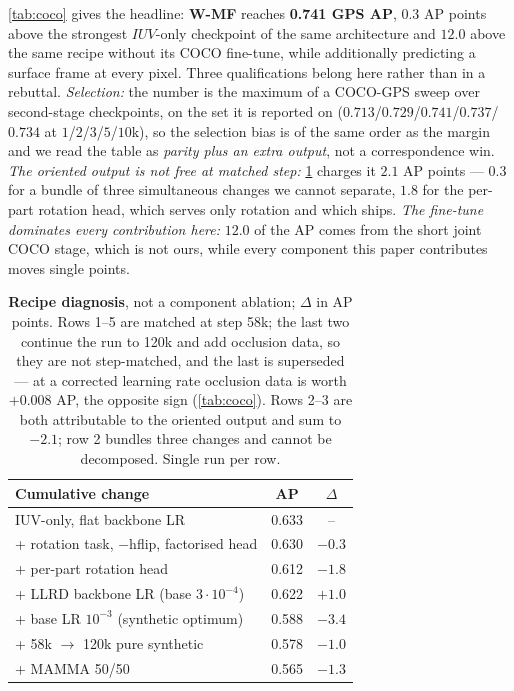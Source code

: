 \cref{tab:coco} gives the headline: \textbf{W-MF} reaches \textbf{0.741 GPS AP}, $0.3$ AP points
above the strongest $IUV$-only checkpoint of the same architecture and $12.0$ above the same recipe
without its COCO fine-tune, while additionally predicting a surface frame at every pixel. Three
qualifications belong here rather than in a rebuttal. \emph{Selection:} the number is the maximum
of a COCO-GPS sweep over second-stage checkpoints, on the set it is reported on
($0.713$/$0.729$/$\mathbf{0.741}$/$0.737$/$0.734$ at $1$/$2$/$3$/$5$/$10$k), so the selection bias
is of the same order as the margin and we read the table as \emph{parity plus an extra output}, not
a correspondence win. \emph{The oriented output is not free at matched step:} \cref{tab:recipe}
charges it $2.1$ AP points --- $0.3$ for a bundle of three simultaneous changes we cannot separate,
$1.8$ for the per-part rotation head, which serves only rotation and which ships. \emph{The
fine-tune dominates every contribution here:} $12.0$ of the AP comes from the short joint COCO
stage, which is not ours, while every component this paper contributes moves single points.

\begin{table}[!tb]
\centering\footnotesize\renewcommand{\arraystretch}{0.94}
\setlength{\tabcolsep}{5pt}
\begin{tabular}{@{}lcc@{}}
\toprule
Cumulative change & AP & $\Delta$ \\
\midrule
IUV-only, flat backbone LR              & 0.633 & --    \\
+ rotation task, $-$hflip, factorised head & 0.630 & $-0.3$ \\
+ per-part rotation head                & 0.612 & $-1.8$ \\
+ LLRD backbone LR (base $3\!\cdot\!10^{-4}$) & 0.622 & $+1.0$ \\
+ base LR $10^{-3}$ (synthetic optimum) & 0.588 & $-3.4$ \\
+ 58k $\rightarrow$ 120k pure synthetic & 0.578 & $-1.0$ \\
+ MAMMA 50/50                           & 0.565 & $-1.3$ \\
\bottomrule
\end{tabular}
\caption{\textbf{Recipe diagnosis}, not a component ablation; $\Delta$ in AP points. Rows 1--5 are
matched at step 58k; the last two continue the run to 120k and add occlusion data, so they are not
step-matched, and the last is superseded --- at a corrected learning rate occlusion data is worth
$+0.008$ AP, the opposite sign (\cref{tab:coco}). Rows 2--3 are both attributable to the oriented
output and sum to $-2.1$; row 2 bundles three changes and cannot be decomposed. Single run per
row.}
\label{tab:recipe}
\end{table}

